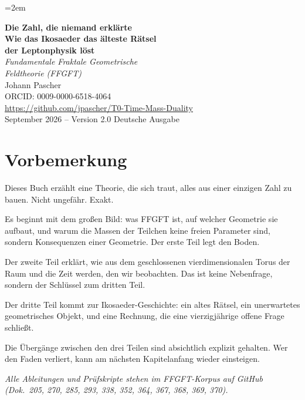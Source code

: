 \documentclass[12pt,oneside]{book}
\begin{document}
\hfuzz=3pt\vfuzz=3pt
\emergencystretch=2em
\sloppy

\frontmatter
\pagestyle{fancy}
\makeatletter\let\ps@plain\ps@fancy\makeatother
\begin{titlepage}
  \centering\vspace*{1.5cm}
  {\Huge\bfseries\color{ffgblue}Die Zahl, die niemand erklärte}\\[0.6cm]
  {\Large\bfseries\color{ffgblue!70}Wie das Ikosaeder das älteste Rätsel\\[0.2cm]der Leptonphysik löst}\\[1.5cm]
  {\LARGE\itshape Fundamentale Fraktale Geometrische\\[0.2cm]Feldtheorie (FFGFT)}\\[2cm]
  {\large Johann Pascher}\\[0.3cm]
  {\normalsize ORCID: 0009-0000-6518-4064}\\[0.3cm]
  {\normalsize\url{https://github.com/jpascher/T0-Time-Mass-Duality}}\\[1.5cm]
  {\normalsize September 2026 -- Version 2.0}\vfill
  {\small Deutsche Ausgabe}
\end{titlepage}
\tableofcontents

\chapter*{Vorbemerkung}

Dieses Buch erzählt eine Theorie, die sich traut, alles aus einer einzigen Zahl zu bauen. Nicht ungefähr. Exakt.

Es beginnt mit dem großen Bild: was FFGFT ist, auf welcher Geometrie sie aufbaut, und warum die Massen der Teilchen keine freien Parameter sind, sondern Konsequenzen einer Geometrie. Der erste Teil legt den Boden.

Der zweite Teil erklärt, wie aus dem geschlossenen vier\-dimen\-sio\-nalen Torus der Raum und die Zeit werden, den wir beobachten. Das ist keine Nebenfrage, sondern der Schlüssel zum dritten Teil.

Der dritte Teil kommt zur Ikosaeder-Geschichte: ein altes Rätsel, ein unerwartetes geometrisches Objekt, und eine Rechnung, die eine vierzigjährige offene Frage schließt.

Die Übergänge zwischen den drei Teilen sind absichtlich explizit gehalten. Wer den Faden verliert, kann am nächsten Kapitelanfang wieder einsteigen.

\vspace{0.5cm}
\noindent\textit{Alle Ableitungen und Prüfskripte stehen im FFGFT-Korpus auf GitHub (Dok.~205, 270, 285, 293, 338, 352, 364, 367, 368, 369, 370).}
\end{document}
